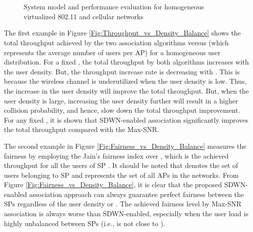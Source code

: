 \documentclass[conference]{IEEEtran}
\begin{document}
\begin{figure*}
	\centering
	\\
	 \\
	\caption{System model and performance evaluation for homogeneous virtualized 802.11 and cellular networks}
	\label{case_study}
	\vspace{10mm}
\end{figure*}


The first example in Figure \ref{Fig:Throughput_vs_Density_Balance} shows the total throughput achieved by the two association algorithms versus  (which represents the average number
of users per AP) for a homogeneous user distribution. For a fixed , the total throughput by both algorithms increases with the user density. But, the throughput increase rate is decreasing with . This is because the wireless channel is underutilized when the user density is low. Thus, the increase in the user density will improve the total throughput. But, when the user density is large, increasing the user density further will result in a higher collision probability, and hence, slow down the total throughput improvement. For any fixed , it is shown that SDWN-enabled association significantly improves the total throughput compared with the Max-SNR.

The second example in Figure \ref{Fig:Fairness_vs_Density_Balance} measures the fairness by employing the Jain's fairness index over , which is the achieved throughput for all the users of SP . It should be noted that  denotes the set of users belonging to SP  and  represents the set of all APs in the networks. From Figure \ref{Fig:Fairness_vs_Density_Balance}, it is clear that the proposed SDWN-enabled association approach can always guarantee perfect fairness between the SPs regardless of the user density or . The achieved fairness level by Max-SNR association is always worse than SDWN-enabled, especially when the user load is highly unbalanced between SPs (i.e.,  is not close to ).
\end{document}
